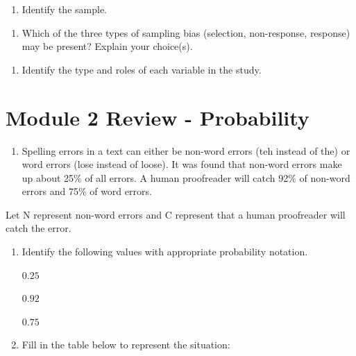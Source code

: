 \documentclass[
]{report}
\providecommand{\tightlist}{%
  \setlength{\itemsep}{0pt}\setlength{\parskip}{0pt}}
\begin{document}
\vspace{0.4in}

\begin{enumerate}
\def\labelenumi{\alph{enumi}.}
\setcounter{enumi}{1}
\tightlist
\item
  Identify the sample.
\end{enumerate}

\vspace{0.4in}

\begin{enumerate}
\def\labelenumi{\alph{enumi}.}
\setcounter{enumi}{2}
\tightlist
\item
  Which of the three types of sampling bias (selection, non-response, response) may be present? Explain your choice(s).
\end{enumerate}

\vspace{0.4in}

\begin{enumerate}
\def\labelenumi{\alph{enumi}.}
\setcounter{enumi}{3}
\tightlist
\item
  Identify the type and roles of each variable in the study.
\end{enumerate}

\vspace{0.6in}

\newpage

\section{Module 2 Review - Probability}\label{module-2-review---probability}

\begin{enumerate}
\def\labelenumi{\arabic{enumi}.}
\tightlist
\item
  Spelling errors in a text can either be non-word errors (teh instead of the) or word errors (lose instead of loose). It was found that non-word errors make up about 25\% of all errors. A human proofreader will catch 92\% of non-word errors and 75\% of word errors.
\end{enumerate}

Let N represent non-word errors and C represent that a human proofreader will catch the error.

\begin{enumerate}
\def\labelenumi{\alph{enumi}.}
\item
  Identify the following values with appropriate probability notation.
  \vspace{2mm}

  \(0.25\)
  \vspace{2mm}

  \(0.92\)
  \vspace{2mm}

  \(0.75\)
  \vspace{2mm}
\item
  Fill in the table below to represent the situation:
\end{enumerate}
\end{document}
